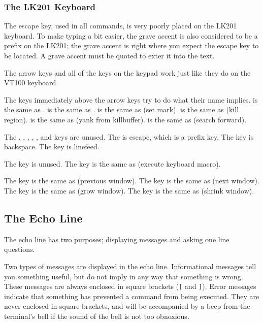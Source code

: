 \subsubsection{The LK201 Keyboard}
The escape key, used in all \META{} commands, is very poorly placed on
the LK201 keyboard. To make typing a bit easier, the grave accent is also
considered to be a \META{} prefix on the LK201;
the grave accent is right where you expect the escape key to be located.
A grave accent must be quoted to exter it into the text.

The arrow keys and all of the keys on the keypad
work just like they do on the VT100 keyboard.

The keys immediately above the arrow keys try to do what their name
implies.  is the same as .
 is the same as
.  is the same as  (set mark).
 is the same as
 (kill region). 
is the same as  (yank from killbuffer).
 is the same as  (search forward).

The , , ,
, , and  keys are unused.
The  is escape, which is a \META{} prefix key.
The  key is backspace. The  key is linefeed.

The  key is unused. The 
key is the same as  (execute keyboard macro).

The  key is the same as  (previous window).
The  key is the same as  (next window).
The  key is the same as  (grow window).
The  key is the same as  (shrink window).
\subsection{The Echo Line}
The echo line has two purposes; displaying messages and asking one
line questions.

Two types of messages are displayed in the echo line.
Informational messages tell you something useful, but do not imply in any
way that something is wrong. These messages are always enclosed in square
brackets (\verb+[+ and \verb+]+).
Error messages indicate that something has
prevented a command from being executed. They are never enclosed in square
brackets, and will be accompanied by a beep from the terminal's bell if
the sound of the bell is not too obnoxious.

